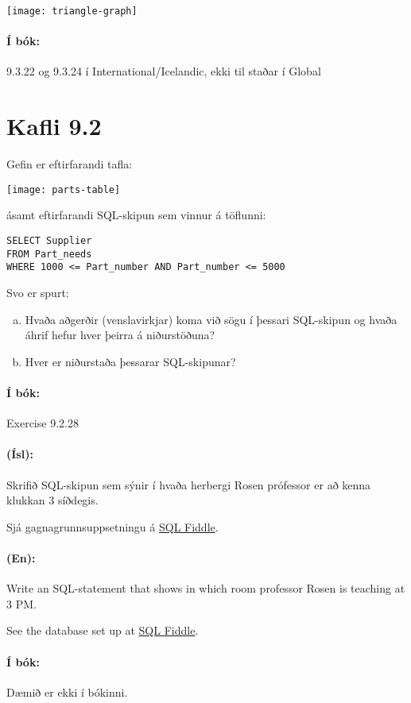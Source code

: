 \documentclass{article}
\begin{document}
\begin{center}
 \texttt{[image: triangle-graph]}
\end{center}
\paragraph{Í bók:} 9.3.22 og 9.3.24 í International/Icelandic, ekki til staðar í Global

\section{Kafli 9.2}

\question Gefin er eftirfarandi tafla:
\begin{center}
\texttt{[image: parts-table]}
\end{center}
ásamt eftirfarandi SQL-skipun sem vinnur á töflunni:
\begin{verbatim}
SELECT Supplier
FROM Part_needs
WHERE 1000 <= Part_number AND Part_number <= 5000
\end{verbatim}
Svo er spurt:

\begin{enumerate}[a)]
 \item Hvaða aðgerðir (venslavirkjar) koma við sögu í þessari SQL-skipun og hvaða áhrif hefur hver þeirra á niðurstöðuna?
 \item Hver er niðurstaða þessarar SQL-skipunar?
\end{enumerate}

\paragraph{Í bók:} Exercise 9.2.28

\question

\paragraph{(Ísl):} Skrifið SQL-skipun sem sýnir í hvaða herbergi Rosen prófessor er að kenna klukkan 3 síðdegis.

Sjá gagnagrunnsuppsetningu á \href{http://sqlfiddle.com/#!9/14848/1}{SQL Fiddle}.

\paragraph{(En):} Write an SQL-statement that shows in which room professor Rosen is teaching at 3 PM.

See the database set up at \href{http://sqlfiddle.com/#!9/14848/1}{SQL Fiddle}.

\paragraph{Í bók:} Dæmið er ekki í bókinni.
\end{document}
